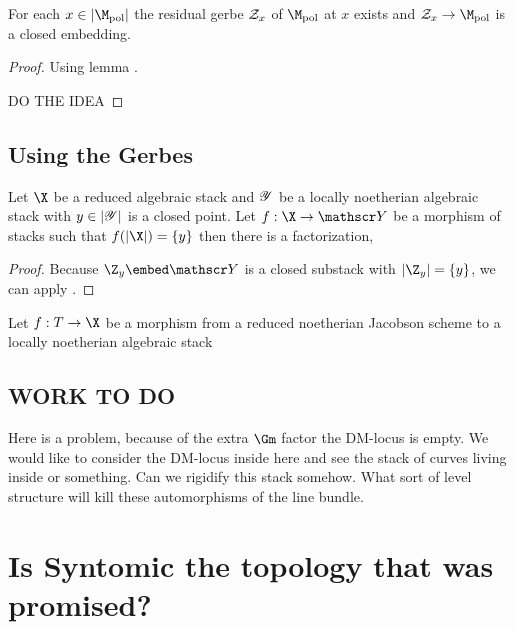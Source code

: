 \documentclass[12pt]{article}
\begin{document}
\begin{cor}
For each $x \in | \M_{\pol} |$ the residual gerbe $\mathcal{Z}_x$ of $\M_{\pol}$ at $x$ exists and $\cZ_x \to \M_{\pol}$ is a closed embedding.
\end{cor}

\begin{proof}
Using lemma . 

DO THE IDEA
\end{proof}

\subsection{Using the Gerbes}

\begin{lemma}
Let $\X$ be a reduced algebraic stack and $\mathscr{Y}$ be a locally noetherian algebraic stack with $y \in |\mathscr{Y}|$ is a closed point. Let $f : \X \to \Y$ be a morphism of stacks such that $f(|\X|) = \{ y \}$ then there is a factorization,
\begin{center}
\end{center}
\end{lemma}

\begin{proof}
Because $\Z_y \embed \Y$ is a closed substack with $|\Z_y| = \{ y \}$, we can apply .
\end{proof}

\begin{prop}
Let $f : T \to \X$ be a morphism from a reduced noetherian Jacobson scheme to a locally noetherian algebraic stack 
\end{prop}

\subsection{WORK TO DO}

Here is a problem, because of the extra $\Gm$ factor the DM-locus is empty. We would like to consider the DM-locus inside here and see the stack of curves living inside or something. Can we rigidify this stack somehow. What sort of level structure will kill these automorphisms of the line bundle. 

\section{Is Syntomic the topology that was promised?}
\end{document}
